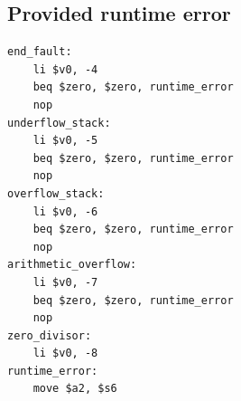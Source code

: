 \subsection{Provided runtime error}
\begin{verbatim}
end_fault:
    li $v0, -4
    beq $zero, $zero, runtime_error
    nop
underflow_stack:
    li $v0, -5
    beq $zero, $zero, runtime_error
    nop
overflow_stack:
    li $v0, -6
    beq $zero, $zero, runtime_error
    nop
arithmetic_overflow:
    li $v0, -7
    beq $zero, $zero, runtime_error
    nop
zero_divisor:
    li $v0, -8
runtime_error:
    move $a2, $s6
\end{verbatim}
